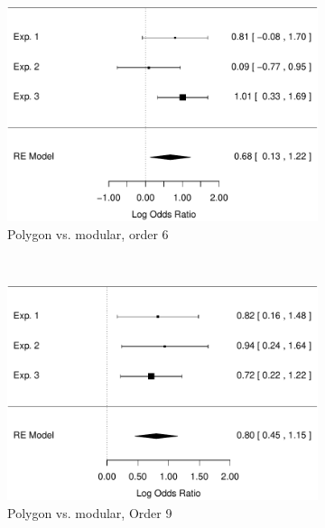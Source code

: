 \documentclass[man,mask,10pt]{apa6}
\begin{document}
\begin{figure}
\centering
\begin{subfigure}[c]{0.4\textwidth}
\centering
\includegraphics[width=\textwidth]{figures/meta/question_typegenerator_true_6_conditionpolygon.pdf}
\caption{Polygon vs. modular, order 6}
\end{subfigure}
~
\begin{subfigure}[c]{0.4\textwidth}
\centering
\includegraphics[width=\textwidth]{figures/meta/question_typegenerator_true_9_conditionpolygon.pdf}
\caption{Polygon vs. modular, Order 9}
\end{subfigure} \\
\centering
\begin{subfigure}[c]{0.4\textwidth}
\centering

\end{subfigure}
\end{figure}
\end{document}
